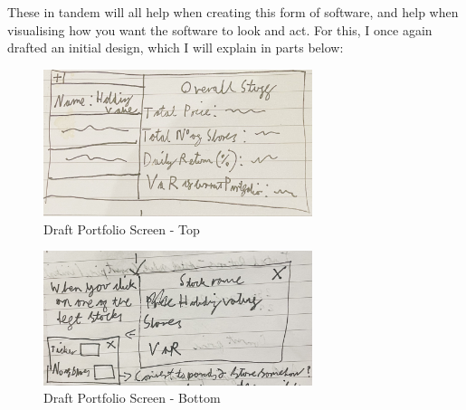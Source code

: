 \documentclass{article}
\begin{document}
These in tandem will all help when creating this form of software, and help when visualising how you want the software to look and act. For this, I once again drafted an initial design, which I will explain in parts below:\\\vspace{0.3cm}

\begin{figure}[h]
  \centering
  \includegraphics[width=0.7\textwidth]{Images/Term 2 Images/IMG_1117.jpg}
  \caption{Draft Portfolio Screen - Top}
  \label{fig:Portfolio Screen Draft Top}
\end{figure}

\begin{figure}[h]
  \centering
  \includegraphics[width=0.7\textwidth]{Images/Term 2 Images/IMG_1347.jpg}
  \caption{Draft Portfolio Screen - Bottom}
  \label{fig:Portfolio Screen Draft Bottom}
\end{figure}
\end{document}
